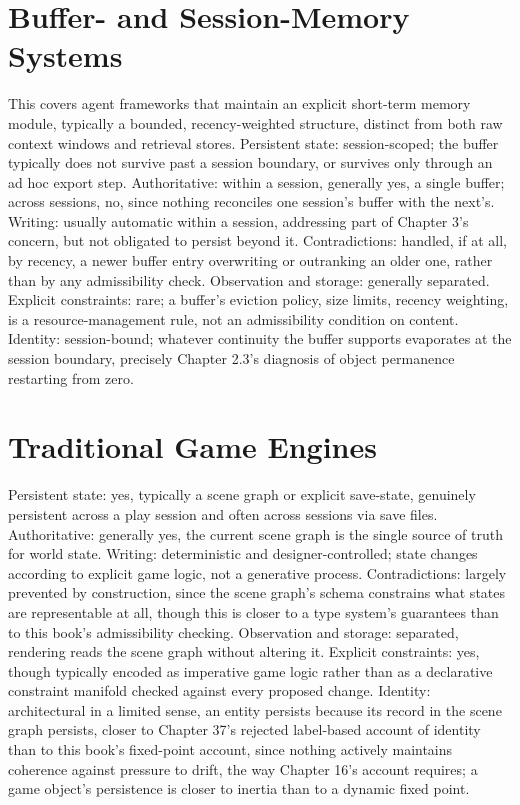\section{Buffer- and Session-Memory Systems}

This covers agent frameworks that maintain an explicit short-term memory module, typically a bounded, recency-weighted structure, distinct from both raw context windows and retrieval stores. Persistent state: session-scoped; the buffer typically does not survive past a session boundary, or survives only through an ad hoc export step. Authoritative: within a session, generally yes, a single buffer; across sessions, no, since nothing reconciles one session's buffer with the next's. Writing: usually automatic within a session, addressing part of Chapter 3's concern, but not obligated to persist beyond it. Contradictions: handled, if at all, by recency, a newer buffer entry overwriting or outranking an older one, rather than by any admissibility check. Observation and storage: generally separated. Explicit constraints: rare; a buffer's eviction policy, size limits, recency weighting, is a resource-management rule, not an admissibility condition on content. Identity: session-bound; whatever continuity the buffer supports evaporates at the session boundary, precisely Chapter 2.3's diagnosis of object permanence restarting from zero.

\section{Traditional Game Engines}

Persistent state: yes, typically a scene graph or explicit save-state, genuinely persistent across a play session and often across sessions via save files. Authoritative: generally yes, the current scene graph is the single source of truth for world state. Writing: deterministic and designer-controlled; state changes according to explicit game logic, not a generative process. Contradictions: largely prevented by construction, since the scene graph's schema constrains what states are representable at all, though this is closer to a type system's guarantees than to this book's admissibility checking. Observation and storage: separated, rendering reads the scene graph without altering it. Explicit constraints: yes, though typically encoded as imperative game logic rather than as a declarative constraint manifold checked against every proposed change. Identity: architectural in a limited sense, an entity persists because its record in the scene graph persists, closer to Chapter 37's rejected label-based account of identity than to this book's fixed-point account, since nothing actively maintains coherence against pressure to drift, the way Chapter 16's account requires; a game object's persistence is closer to inertia than to a dynamic fixed point.

